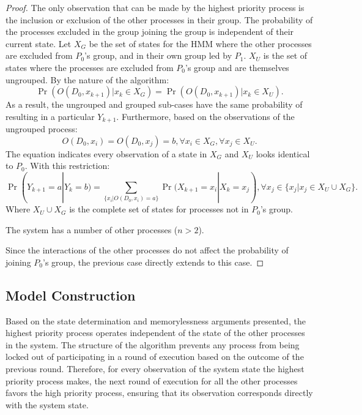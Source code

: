 \begin{proof}
The only observation that can be made by the highest priority process is the inclusion or exclusion of the other processes in their group.
The probability of the processes excluded in the group joining the group is independent of their current state.
Let $X_G$ be the set of states for the \ac{HMM} where the other processes are excluded from $P_0$'s group, and in their own group led by $P_1$.
$X_U$ is the set of states where the processes are excluded from $P_0$'s group and are themselves ungrouped.
By the nature of the algorithm: 
\begin{equation}
\Pr(O(D_0, x_{k+1}) | x_k \in X_G) = \Pr(O(D_0, x_{k+1}) | x_k \in X_U).
\label{eq:sameprob}
\end{equation}
As a result, the ungrouped and grouped sub-cases have the same probability of resulting in a particular $Y_{k+1}$.
Furthermore, based on the observations of the ungrouped process:
\begin{equation}
O(D_0, x_i) = O(D_0, x_j) = b, \forall x_i \in X_G, \forall x_j \in X_U.
\end{equation}
The equation indicates every observation of a state in $X_G$ and $X_U$ looks identical to $P_0$.
With this restriction:
\begin{equation}
    \Pr(Y_{k+1}=a | Y_{k}=b) = \sum_{\{x_{i} | O(D_0, x_{i}) = a\}} \Pr(X_{k+1}=x_i | X_{k}=x_j), \forall x_j \in \{x_j | x_j \in X_U \cup X_G\}.
\end{equation}
Where $X_U \cup X_G$ is the complete set of states for processes not in $P_0$'s group.

\begin{case}
    The system has a number of other processes ($n > 2$).
\end{case}
Since the interactions of the other processes do not affect the probability of joining $P_0$'s group, the previous case directly extends to this case.

\end{proof}

\subsection{Model Construction}

Based on the state determination and memorylessness arguments presented, the highest priority process operates independent of the state of the other processes in the system.
The structure of the algorithm prevents any process from being locked out of participating in a round of execution based on the outcome of the previous round.
Therefore, for every observation of the system state the highest priority process makes, the next round of execution for all the other processes favors the high priority process, ensuring that its observation corresponds directly with the system state.

